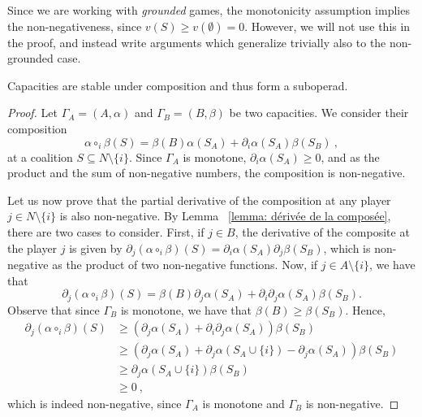 \documentclass[a4paper,12pt]{amsart}
\begin{document}
\begin{remark}
Since we are working with \textit{grounded} games, the monotonicity assumption implies the non-negativeness, since $v(S) \geq v(\emptyset) = 0$. However, we will not use this in the proof, and instead write arguments which generalize trivially also to the non-grounded case. 
\end{remark}

\begin{theorem}\label{proposition: capacities are stable under composition}
Capacities are stable under composition and thus form a suboperad. 
\end{theorem}

\begin{proof}
Let \(\Gamma_A = (A, \alpha)\) and \(\Gamma_B = (B, \beta)\) be two capacities. We consider their composition 
\[
\alpha \circ_i \beta(S) = \beta(B) \alpha(S_A) + \partial_i \alpha(S_A) \beta(S_B)~,
\]
at a coalition $S \subseteq N \setminus \{i\}$. Since $\Gamma_A$ is monotone, $\partial_i \alpha(S_A) \geq 0$, and as the product and the sum of non-negative numbers, the composition is non-negative.

\medskip

Let us now prove that the partial derivative of the composition at any player \(j \in N \setminus \{i\}\) is also non-negative. By Lemma ~\ref{lemma: dérivée de la composée}, there are two cases to consider. First, if \(j \in B\), the derivative of the composite at the player $j$ is given by \(\partial_j (\alpha \circ_i \beta)(S) = \partial_i \alpha(S_A) \partial_j \beta(S_B)\), which is non-negative as the product of two non-negative functions.  Now, if \(j \in A \setminus \{i\} \), we have that 
\[
\partial_j (\alpha \circ_i \beta)(S) = \beta(B) \partial_j \alpha(S_A) + \partial_i \partial_j \alpha(S_A) \beta(S_B). 
\]
Observe that since \(\Gamma_B\) is monotone, we have that \(\beta(B) \geq \beta(S_B)\). Hence, 
    \[ \begin{aligned} 
    \partial_j (\alpha \circ_i \beta)(S) & \geq \left( \partial_j \alpha(S_A) + \partial_i \partial_j \alpha(S_A) \right) \beta(S_B) \\ 
    &\geq \left( \partial_j \alpha(S_A) + \partial_j \alpha(S_A \cup \{i\}) - \partial_j \alpha(S_A) \right) \beta(S_B) \\
    &\geq \partial_j \alpha(S_A \cup \{i\}) \beta(S_B) \\
    & \geq 0~, 
    \end{aligned} \]
which is indeed non-negative, since $\Gamma_A$ is monotone and $\Gamma_B$ is non-negative. 
\end{proof}
\end{document}
